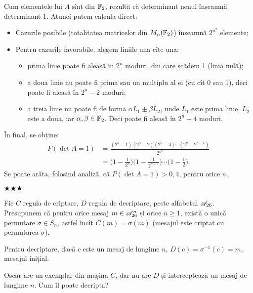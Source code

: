 Cum elementele lui $ A $ sînt din $ \mathbb{F}_2 $, rezultă că determinant
nenul înseamnă determinant 1. Atunci putem calcula direct:
\begin{itemize}
\item Cazurile posibile (totalitatea matricelor din $ M_n(\mathbb{F}_2) $)
  înseamnă $ 2^{n^2} $ elemente;
\item Pentru cazurile favorabile, alegem liniile una cîte una:
  \begin{itemize}
  \item prima linie poate fi aleasă în $ 2^n $ moduri, din care scădem 1 (linia nulă);
  \item a doua linie nu poate fi prima sau un multiplu al ei (cu cît 0 sau 1), deci
    poate fi aleasă în $ 2^n - 2 $ moduri;
  \item a treia linie nu poate fi de forma $ \alpha L_1 \pm \beta L_2 $, unde $ L_1 $
    este prima linie, $ L_2 $ este a doua, iar $ \alpha, \beta \in \mathbb{F}_2 $. Deci poate
    fi aleasă în $ 2^n - 4 $ moduri.
  \end{itemize}
\end{itemize}

În final, se obține:
\begin{align*}
  P(\det A = 1) &= \frac{(2^n - 1)(2^n - 2)(2^n - 4) \cdots (2^n - 2^{n-1})}{2^{n^2}} \\
                &= \Big( 1 - \frac{1}{2^n} \Big) \Big( 1 - \frac{1}{2^{n-1}} \Big) \cdots %
                  \Big( 1 - \frac{1}{2} \Big).
\end{align*}
Se poate arăta, folosind analiză, că $ P(\det A = 1) > 0,4 $, pentru orice $ n $.

\begin{center}
  {\large $\bigstar\bigstar\bigstar$}
\end{center}

Fie $ C $ regula de criptare, $ D $ regula de decriptare, peste alfabetul
$ \mathscr{A}_{26} $. Presupunem că pentru orice mesaj $ m \in \mathscr{A}_{26}^n $
și orice $ n \geq 1 $, există o unică permutare $ \sigma \in S_n $,
astfel încît $ C(m) = \sigma(m) $ (mesajul este criptat cu permutarea $ \sigma $).

Pentru decriptare, dacă $ c $ este un mesaj de lungime $ n $, $D(c) = \sigma^{-1}(c) = m $,
mesajul inițial.

Oscar are un exemplar din mașina $ C $, dar nu are $ D $ și interceptează un mesaj
de lungime $ n $. Cum îl poate decripta?


